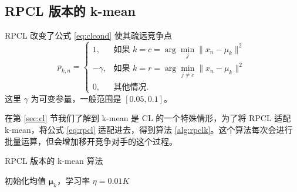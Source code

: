         \subsection{RPCL 版本的 k-mean} 

        RPCL 改变了公式 \eqref{eq:clcond} 使其疏远竞争点
        \begin{equation}
            p_{k,n}=\begin{cases}
                1, & \text{如果 }k=c=\arg\min_j\|x_n-\mu_k\|^2\\
                -\gamma, & \text{如果 }k=r=\arg\min_{j\neq c}\|x_n-\mu_k\|^2\\
                0, & \text{其他情况}.
            \end{cases}\label{eq:rpcl}
        \end{equation}
        这里 $\gamma$ 为可变参量，一般范围是 $[0.05,0.1]$。

        在第 \ref{sec:cl} 节我们了解到 k-mean 是 CL 的一个特殊情形，为了将 RPCL 适配 k-mean，将公式 \eqref{eq:rpcl} 适配进去，得到算法 \ref{alg:rpclk}。这个算法每次会进行批量运算，但会增加移开竞争对手的这个过程。

        \begin{algorithm}
            \caption{RPCL 版本的 k-mean 算法}\label{alg:rpclk}
            \BlankLine
            初始化均值 $\bm{\mu}_k$，学习率 $\eta=0.01K$\;
            \Return{$\bm{\mu}$}\;
        \end{algorithm}

